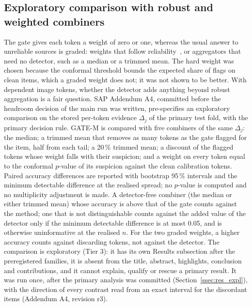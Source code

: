\subsection{Exploratory comparison with robust and weighted combiners}\label{ssec:tier3}
The gate gives each token a weight of zero or one, whereas the usual answer to unreliable sources is graded: weights that follow
reliability~\citep{chair1986optimal,huang2025evidential}, or aggregators that need no detector, such as a median or a trimmed mean.
The hard weight was chosen because the conformal threshold bounds the expected share of flags on clean items, which a graded weight
does not; it was not shown to be better.
With dependent image tokens, whether the detector adds anything beyond robust aggregation is a fair question.
SAP Addendum A4, committed before the headroom decision of the main run was written, pre-specifies an exploratory comparison on
the stored per-token evidence $\Delta_j$ of the primary test fold, with the primary decision rule.
GATE-M is compared with five combiners of the same $\Delta_j$: the median; a trimmed mean that removes as many tokens as the gate
flagged for the item, half from each tail; a 20\,\% trimmed mean; a discount of the flagged tokens whose weight falls with their
suspicion; and a weight on every token equal to the conformal $p$-value of its suspicion against the clean calibration tokens.
Paired accuracy differences are reported with bootstrap 95\,\% intervals and the minimum detectable difference at the realised
spread; no $p$-value is computed and no multiplicity adjustment is made.
A detector-free combiner (the median or either trimmed mean) whose accuracy is above that of the gate counts against the method; one
that is not distinguishable counts against the added value of the detector only if the minimum detectable difference is at most
0.05, and is otherwise uninformative at the realised $n$.
For the two graded weights, a higher accuracy counts against discarding tokens, not against the detector.
The comparison is exploratory (Tier 3): it has its own Results subsection after the preregistered families, it is absent from the
title, abstract, highlights, conclusion and contributions, and it cannot explain, qualify or rescue a primary result.
It was run once, after the primary analysis was committed (Section~\ref{ssec:res_expl}), with the direction of every contrast read from
an exact interval for the discordant items (Addendum A4, revision r3).

